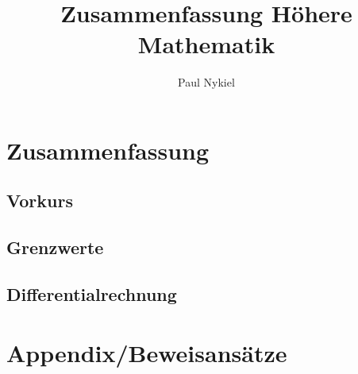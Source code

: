 \documentclass[10pt]{report}
\title{Zusammenfassung Höhere Mathematik}
\author{Paul Nykiel}
\begin{document}
    \maketitle
    \pagebreak
    \tableofcontents
    \pagebreak

    \part{Zusammenfassung}
    \chapter{Vorkurs}
    

    \chapter{Grenzwerte}
    

    \chapter{Differentialrechnung}
    

    \part{Appendix/Beweisansätze}
    
\end{document}
